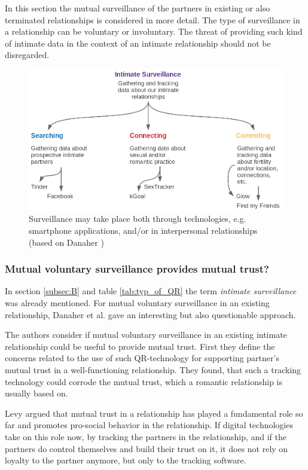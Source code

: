 In this section the mutual surveillance of the partners in existing or also terminated relationships is considered in more detail. 
The type of surveillance in a relationship can be voluntary or involuntary. The threat of providing such kind of intimate data in the context of an intimate relationship should not be disregarded.
\begin{figure}[htb]
	\centering
	\includegraphics[width=\linewidth]{img/summarizing.png}
	\caption{Surveillance may take place both through technologies, e.g. smartphone applications, and/or in interpersonal relationships (based on Danaher \cite{ethicsOfSurveillance})}
	\label{fig:intimate_surveillance}
\end{figure}

\subsubsection{Mutual voluntary surveillance provides mutual trust?}
In section \ref{subsec:B} and table \ref{tab:typ_of_QR} the term \textit{intimate surveillance} was already mentioned.
For mutual voluntary surveillance in an existing relationship, Danaher et al. \cite{doi:10.1080/15265161.2017.1409823} gave an interesting but also questionable approach.

The authors consider if mutual voluntary surveillance in an existing intimate relationship could be useful to provide mutual trust.
First they define the concerns related to the use of such \acs{QR}-technology for supporting partner's mutual trust in a well-functioning relationship. They found, that such a tracking technology could corrode the mutual trust, which a romantic relationship is usually based on.

Levy \cite{levy2014intimate} argued that mutual trust in a relationship has played a fundamental role so far and promotes pro-social behavior in the relationship. If digital technologies take on this role now, by tracking the partners in the relationship, and if the partners do control themselves and build their trust on it, it does not rely on loyalty to the partner anymore, but only to the tracking software.

